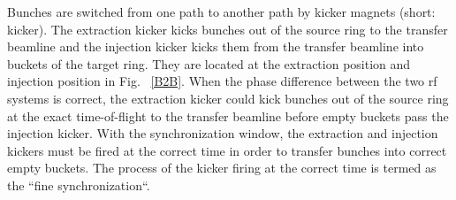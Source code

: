 Bunches are switched from one path to another path by kicker magnets (short: kicker). The extraction kicker kicks bunches out of the source ring to the transfer beamline and the injection kicker kicks them from the transfer beamline into buckets of the target ring. They are located at the extraction position and injection position in Fig. ~\ref{B2B}. When the phase difference between the two rf systems is correct, the extraction kicker could kick bunches out of the source ring at the exact time-of-flight to the transfer beamline before empty buckets pass the injection kicker. With the synchronization window, the extraction and injection kickers must be fired at the correct time in order to transfer bunches into correct empty buckets. The process of the kicker firing at the correct time is termed as the ``fine synchronization``.

%
